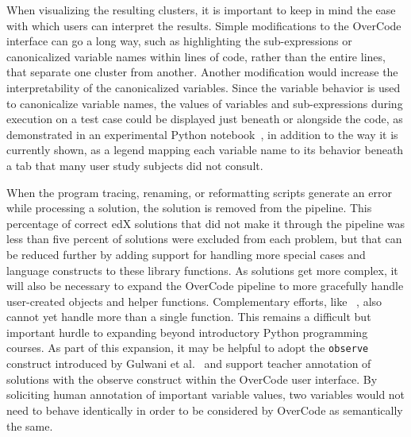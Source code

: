 When visualizing the resulting clusters, it is important to keep in mind the ease with which users can interpret the results. Simple modifications to the OverCode interface can go a long way, such as highlighting the sub-expressions or canonicalized variable names within lines of code, rather than the entire lines, that separate one cluster from another. Another modification would increase the interpretability of the canonicalized variables. Since the variable behavior is used to canonicalize variable names, the values of variables and sub-expressions during execution on a test case could be displayed just beneath or alongside the code, as demonstrated in an experimental Python notebook~\cite{kevinkwokdemo}, in addition to the way it is currently shown, as a legend mapping each variable name to its behavior beneath a tab that many user study subjects did not consult. 



When the program tracing, renaming, or reformatting scripts generate an error while processing a solution, the solution is removed from the pipeline. This percentage of correct edX solutions that did not make it through the pipeline was less than five percent of solutions were excluded from each problem, but that can be reduced further by adding support for handling more special cases and language constructs to these library functions. As solutions get more complex, it will also be necessary to expand the OverCode pipeline to more gracefully handle user-created objects and helper functions. Complementary efforts, like ~\cite{choudhury2016autostyle}, also cannot yet handle more than a single function. This remains a difficult but important hurdle to expanding beyond introductory Python programming courses. As part of this expansion, it may be helpful to adopt the \texttt{observe} construct introduced by Gulwani et al.~\cite{gulwani_fse14} and support teacher annotation of solutions with the observe construct within the OverCode user interface. By soliciting human annotation of important variable values, two variables would not need to behave identically in order to be considered by OverCode as semantically the same.%

